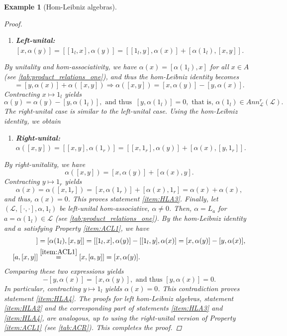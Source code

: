 \documentclass[12pt]{article}
\newtheorem{example}[theorem]{Example}
\begin{document}
\begin{example}[Hom-Leibniz algebras]
\begin{proof}
\begin{enumerate}[label=,leftmargin=*]
					\item\textbf{Left-unital: } $[x,\alpha(y)]=[[1_l,x],\alpha(y)]=[[1_l,y],\alpha(x)]+[\alpha(1_l),[x,y]]$.
				\end{enumerate}
				By unitality and hom-associativity, we have $\alpha(x)=[\alpha(1_l),x]$ for all $x\in A$ (see \cref{tab:product_relations_one}), and thus the hom-Leibniz identity becomes
				\begin{equation*}
					[x,\alpha(y)]=[y,\alpha(x)]+\alpha([x,y])\Rightarrow \alpha([x,y])=[x,\alpha(y)]-[y,\alpha(x)].
				\end{equation*}
				Contracting $x\mapsto 1_l$ yields
				\begin{equation*}
					\alpha(y)=\alpha(y)-[y,\alpha(1_l)], \text{ and thus }\ [y,\alpha(1_l)]=0, \text{ that is, } \alpha(1_l)\in Ann_\mathcal{L}^r(\mathcal{L}).
				\end{equation*}
				The right-unital case is similar to the left-unital case. Using the hom-Leibniz identity, we obtain
				\begin{enumerate}[label=,leftmargin=*]
					\item\textbf{Right-unital: } $\alpha([x,y])=[[x,y],\alpha(1_r)]=[[x,1_r],\alpha(y)]+[\alpha(x),[y,1_r]]$.
				\end{enumerate}
				By right-unitality, we have
				\begin{equation*}
					\alpha([x,y])=[x,\alpha(y)]+[\alpha(x),y].
				\end{equation*}
				Contracting $y\mapsto 1_r$ yields
				\begin{equation*}
					\alpha(x)=\alpha([x,1_r])=[x,\alpha(1_r)]+[\alpha(x),1_r]=\alpha(x)+\alpha(x),
				\end{equation*}
				and thus, $\alpha(x)=0$. This proves statement \ref{item:HLA3}. Finally, let $(\mathcal{L},[\cdot,\cdot],\alpha,1_l)$ be left-unital hom-associative, $\alpha\neq 0$. Then, $\alpha=L_a$ for $a=\alpha(1_l)\in \mathcal{L}$ (see \cref{tab:product_relations_one}). By the hom-Leibniz identity and $a$ satisfying Property \ref{item:ACL1}, we have
				\begin{align*}
					[a,[x,y]]&=[\alpha(1_l),[x,y]]=[[1_l,x],\alpha(y)]-[[1_l,y],\alpha(x)]=[x,\alpha(y)]-[y,\alpha(x)],\\
					[a,[x,y]]&\overset{\ref{item:ACL1}}{=}[x,[a,y]]=[x,\alpha(y)].
				\end{align*}
				Comparing these two expressions yields
				\begin{equation*}
					[x,\alpha(y)]-[y,\alpha(x)]=[x,\alpha(y)], \text{ and thus } [y,\alpha(x)]=0.
				\end{equation*}
				In particular, contracting $y\mapsto 1_l$ yields $\alpha(x)=0$. This contradiction proves statement \ref{item:HLA4}. The proofs for left hom-Leibniz algebras, statement \ref{item:HLA2} and the corresponding part of statements \ref{item:HLA3} and \ref{item:HLA4}, are analogous, up to using the right-unital version of Property \ref{item:ACL1} (see \cref{tab:ACR}). This completes the proof.
			\end{proof}
		\end{example}
		
\end{document}

